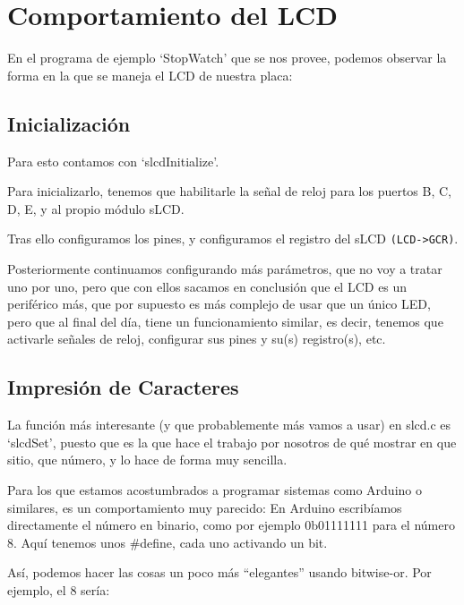 \documentclass[a4paper,openright,12pt]{article}
\begin{document}
\clearpage
\section{Comportamiento del LCD}
En el programa de ejemplo `StopWatch' que se nos provee, podemos observar la forma en la que se maneja el LCD de nuestra placa:

\subsection{Inicialización}
Para esto contamos con `slcdInitialize'.

Para inicializarlo, tenemos que habilitarle la señal de reloj para los puertos B, C, D, E, y al propio módulo sLCD.

Tras ello configuramos los pines, y configuramos el registro del sLCD \texttt{(LCD->GCR)}.

Posteriormente continuamos configurando más parámetros, que no voy a tratar uno por uno, pero que con ellos sacamos en conclusión que el LCD es un periférico más, que por
supuesto es más complejo de usar que un único LED, pero que al final del día, tiene un funcionamiento similar, es decir, tenemos que activarle señales de reloj, configurar
sus pines y su(s) registro(s), etc.

\subsection{Impresión de Caracteres}
La función más interesante (y que probablemente más vamos a usar) en slcd.c es `slcdSet', puesto que es la que hace el trabajo por nosotros de qué mostrar en que sitio,
que número, y lo hace de forma muy sencilla.

Para los que estamos acostumbrados a programar sistemas como Arduino o similares, es un comportamiento muy parecido: En Arduino escribíamos directamente el número en binario,
como por ejemplo 0b01111111 para el número 8. Aquí tenemos unos \#define, cada uno activando un bit.

Así, podemos hacer las cosas un poco más ``elegantes'' usando bitwise-or. Por ejemplo, el 8 sería:
\end{document}
